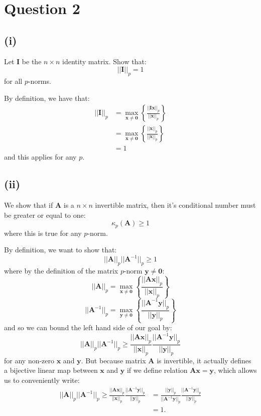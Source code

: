 \documentclass[10pt]{article}
\newcommand{\vc}[1]{\boldsymbol{#1}}
\newcommand{\mat}[1]{\mathbf{#1}}
\begin{document}
\section{Question 2}

\subsection{(i)}
Let $\mat{I}$ be the $n\times n$ identity matrix. Show that:
$$||\mat{I}||_p=1$$
for all $p$-norms.

\noindent\hrulefill

By definition, we have that:
\begin{align*}
    ||\mat{I}||_p
    &=\max_{\mat{x}\neq\mat{0}}
    \left\{\frac{||\mat{I}\mat{x}||_p}{||\mat{x}||_p}\right\} \\
    &=\max_{\mat{x}\neq\mat{0}}
    \left\{\frac{||\mat{x}||_p}{||\mat{x}||_p}\right\} \\
    &=1
\end{align*}
and this applies for any $p$.

\subsection{(ii)}
We show that if $\mathbf{A}$ is a $n\times n$ invertible matrix, then it's
conditional number must be greater or equal to one:
$$\kappa_p(\mathbf{A})\geq1$$
where this is true for any $p$-norm.

\noindent\hrulefill

By definition, we want to show that:
$$||\mathbf{A}||_p ||\mathbf{A}^{-1}||_p\geq1$$
where by the definition of the matrix $p$-norm $\mat{y}\neq\vc{0}$:
$$||\mat{A}||_p=
\max_{\mat{x}\neq\mat{0}}
\left\{\frac{||\mat{A}\mat{x}||_p}{||\mat{x}||_p}\right\}$$
$$||\mat{A}^{-1}||_p=
\max_{\mat{y}\neq\mat{0}}
\left\{\frac{||\mat{A}^{-1}\mat{y}||_p}{||\mat{y}||_p}\right\}$$
and so we can bound the left hand side of our goal by:
$$||\mathbf{A}||_p ||\mathbf{A}^{-1}||_p
\geq
\frac{||\mat{A}\mat{x}||_p}{||\mat{x}||_p}
\frac{||\mat{A}^{-1}\mat{y}||_p}{||\mat{y}||_p}$$
for any non-zero $\mat{x}$ and $\mat{y}$. But because matrix $\mat{A}$ is
invertible, it actually defines a bijective linear map between $\mat{x}$ and
$\mat{y}$ if we define relation $\mat{A}\mat{x}=\mat{y}$, which allows us to
conveniently write:
\begin{align*}
    ||\mathbf{A}||_p ||\mathbf{A}^{-1}||_p
    \geq
    \frac{||\mat{A}\mat{x}||_p}{||\mat{x}||_p}
    \frac{||\mat{A}^{-1}\mat{y}||_p}{||\mat{y}||_p}
    &=
    \frac{||\mat{y}||_p}{||\mat{A}^{-1}\mat{y}||_p}
    \frac{||\mat{A}^{-1}\mat{y}||_p}{||\mat{y}||_p} \\
    &=1.
\end{align*}
\end{document}

